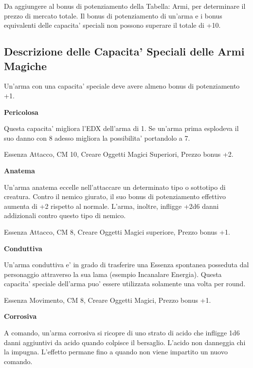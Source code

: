 \documentclass[a4paper,11pt,twoside,openany]{book}
\begin{document}
{\begin{tabular}{ll}
		\end{tabular}
		
		\bigskip
		
		Da aggiungere al bonus di potenziamento della Tabella: Armi, per determinare
		il prezzo di mercato totale. Il bonus di potenziamento di un'arma
		e i bonus equivalenti delle capacita' speciali non possono superare
		il totale di +10.
		
		\subsection{Descrizione delle Capacita' Speciali delle Armi Magiche}
		
		\label{descrizione-delle-capacita-speciali-delle-armi-magiche}
		
		Un'arma con una capacita' speciale deve avere almeno bonus di potenziamento +1.
		
		\textbf{Pericolosa}
		
		Questa capacita' migliora l'EDX dell'arma di 1. Se un'arma prima esplodeva il suo danno con 8 adesso migliora la possibilita' portandolo a 7.
		
		Essenza Attacco, CM 10, Creare Oggetti Magici Superiori, Prezzo bonus +2.
		
		\textbf{Anatema}
		
		Un'arma anatema eccelle nell'attaccare un determinato tipo o sottotipo di creatura. Contro il nemico giurato, il suo bonus di potenziamento effettivo aumenta di +2 rispetto al normale. L'arma, inoltre, infligge +2d6 danni addizionali contro questo tipo di nemico. 
		
		Essenza Attacco, CM 8, Creare Oggetti Magici superiore, Prezzo bonus +1.
		
		\textbf{Conduttiva}
		
		Un'arma conduttiva e' in grado di trasferire una Essenza spontanea posseduta dal personaggio attraverso la sua lama (esempio Incanalare Energia). Questa capacita' speciale dell'arma puo' essere utilizzata solamente una volta per round.
		
		Essenza Movimento, CM 8, Creare Oggetti Magici, Prezzo bonus +1.
		
		\textbf{Corrosiva}
		
		A comando, un'arma corrosiva si ricopre di uno strato di acido che infligge 1d6 danni aggiuntivi da acido quando colpisce il bersaglio. L'acido non danneggia chi la impugna. L'effetto permane fino a quando non viene impartito un nuovo comando.
		
}
\end{document}

